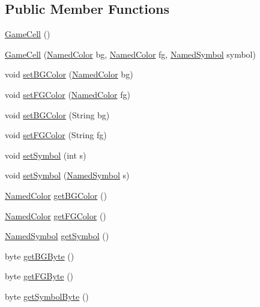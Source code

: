 \subsection*{Public Member Functions}
\begin{DoxyCompactItemize}
\item 
\hyperlink{classbridges_1_1base_1_1_game_cell_a59a4bedeb15c55b71998635520eae21e}{Game\+Cell} ()
\item 
\hyperlink{classbridges_1_1base_1_1_game_cell_aa8c18bc86d5595a6372dbdda66add0fd}{Game\+Cell} (\hyperlink{enumbridges_1_1base_1_1_named_color}{Named\+Color} bg, \hyperlink{enumbridges_1_1base_1_1_named_color}{Named\+Color} fg, \hyperlink{enumbridges_1_1base_1_1_named_symbol}{Named\+Symbol} symbol)
\item 
void \hyperlink{classbridges_1_1base_1_1_game_cell_aa29ae1568daddbc1ca5eec2155385f10}{set\+B\+G\+Color} (\hyperlink{enumbridges_1_1base_1_1_named_color}{Named\+Color} bg)
\item 
void \hyperlink{classbridges_1_1base_1_1_game_cell_af01906e011187218bddf63ddce8c42eb}{set\+F\+G\+Color} (\hyperlink{enumbridges_1_1base_1_1_named_color}{Named\+Color} fg)
\item 
void \hyperlink{classbridges_1_1base_1_1_game_cell_a60805632dec196bfbae6a4de40171447}{set\+B\+G\+Color} (String bg)
\item 
void \hyperlink{classbridges_1_1base_1_1_game_cell_a3ffaf3300d8196a92d46e7c88ae32a86}{set\+F\+G\+Color} (String fg)
\item 
void \hyperlink{classbridges_1_1base_1_1_game_cell_a5e6b4ed374ed3ec4bd6e72723e94848e}{set\+Symbol} (int s)
\item 
void \hyperlink{classbridges_1_1base_1_1_game_cell_a246ba3b4a56f2e440ac21fb0ba297e06}{set\+Symbol} (\hyperlink{enumbridges_1_1base_1_1_named_symbol}{Named\+Symbol} s)
\item 
\hyperlink{enumbridges_1_1base_1_1_named_color}{Named\+Color} \hyperlink{classbridges_1_1base_1_1_game_cell_a7e910723cc5a678ef75f24f993b0c2ca}{get\+B\+G\+Color} ()
\item 
\hyperlink{enumbridges_1_1base_1_1_named_color}{Named\+Color} \hyperlink{classbridges_1_1base_1_1_game_cell_a9355404eb09017ca7ee3e90490e1d13b}{get\+F\+G\+Color} ()
\item 
\hyperlink{enumbridges_1_1base_1_1_named_symbol}{Named\+Symbol} \hyperlink{classbridges_1_1base_1_1_game_cell_a5c5ce5b363e442ac10c8588cbec77511}{get\+Symbol} ()
\item 
byte \hyperlink{classbridges_1_1base_1_1_game_cell_ad431b73e9e0c9e4b0ab539468e8d3a58}{get\+B\+G\+Byte} ()
\item 
byte \hyperlink{classbridges_1_1base_1_1_game_cell_ad1a05ce3e8ca8e148d867e6248023253}{get\+F\+G\+Byte} ()
\item 
byte \hyperlink{classbridges_1_1base_1_1_game_cell_a6b5589c577f2d89c0e98436eea667d77}{get\+Symbol\+Byte} ()
\end{DoxyCompactItemize}
